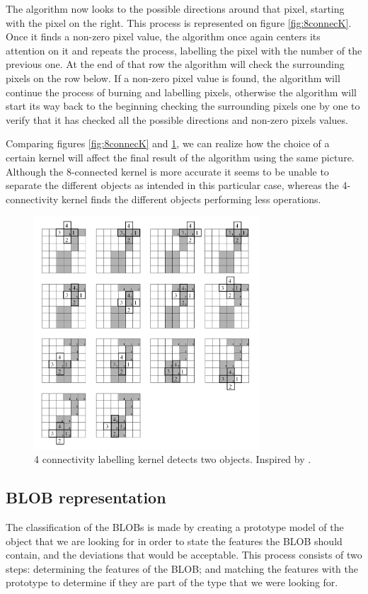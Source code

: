 {The algorithm now looks to the possible directions around that pixel, starting with the pixel on the right. This process is represented on figure \ref{fig:8connecK}. Once it finds a non-zero pixel value, the algorithm once again centers its attention on it and repeats the process, labelling the pixel with the number of the previous one. At the end of that row the algorithm will check the surrounding pixels on the row below. If a non-zero pixel value is found, the algorithm will continue the process of burning and labelling pixels, otherwise the algorithm will start its way back to the beginning checking the surrounding pixels one by one to verify that it has checked all the possible directions and non-zero pixels values.

Comparing figures \ref{fig:8connecK} and \ref{fig:4connecK}, we can realize how the choice of a certain kernel will affect the final result of the algorithm using the same picture. Although the 8-connected kernel is more accurate it seems to be unable to separate the different objects as intended in this particular case, whereas the 4-connectivity kernel finds the different objects performing less operations.

\begin{figure}[htbp]
\centering
\includegraphics[width=0.75\textwidth]{Pictures/Theory/4connec_kernel.png}
\caption{4 connectivity labelling kernel detects two objects. Inspired by \citep{ip_book}.}
\label{fig:4connecK}
\end{figure}

\subsection{BLOB representation}
The classification of the BLOBs is made by creating a prototype model of the object that we are looking for in order to state the features the BLOB should contain, and the deviations that would be acceptable. This process consists of two steps: determining the features of the BLOB; and matching the features with the prototype to determine if they are part of the type that we were looking for.

}
